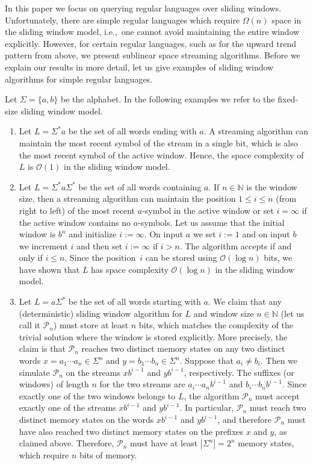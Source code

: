 \documentclass{theoretics}
\newcommand{\N}{\mathbb{N}}
\renewcommand{\O}{\mathcal{O}}
\renewcommand{\P}{\mathcal{P}}
\renewcommand{\leq}{\leqslant}
\renewcommand{\le}{\leq}
\begin{document}
In this paper we focus on querying regular languages over sliding windows.
Unfortunately, there are simple regular languages which require $\Omega(n)$ space in the sliding window model,
i.e.,~one cannot avoid maintaining the entire window explicitly.
However, for certain regular languages, such as for the upward trend pattern from above,
we present sublinear space streaming algorithms.
Before we explain our results in more detail, let us give 
examples of sliding window algorithms for simple regular languages.

\begin{example} 
\label{ex:three-sw}
Let $\Sigma = \{a,b\}$ be the alphabet. In the following examples we refer to the fixed-size sliding window model.
\begin{enumerate}[label=(\roman{*}), ref=(\roman{*})]
\item Let $L = \Sigma^* a$ be the set of all words ending with $a$.
A streaming algorithm can maintain the most recent symbol of the stream in a single bit,
which is also the most recent symbol of the active window.
Hence, the space complexity of $L$ is $\O(1)$ in the sliding window model.
\item Let $L = \Sigma^* a \Sigma^*$ be the set of all words containing $a$.
If $n \in \N$ is the window size,
then a streaming algorithm can maintain the position $1 \le i \le n$ (from right to left)
of the most recent $a$-symbol in the active window or set $i = \infty$ if the active window contains no $a$-symbols.
Let us assume that the initial window is $b^n$
and initialize $i := \infty$.
On input $a$ we set $i := 1$
and on input $b$ we increment $i$
and then set $i := \infty$ if $i > n$.
The algorithm accepts if and only if $i \le n$.
Since the position~$i$ can be stored using $\O(\log n)$ bits,
we have shown that $L$ has space complexity $\O(\log n)$ in the sliding window model.

\item Let $L = a \Sigma^*$ be the set of all words starting with $a$.
We claim that any (deterministic) sliding window algorithm for $L$
and window size $n \in \N$ 
(let us call it $\P_n$) must store at least $n$ bits,
which matches the complexity of the trivial solution where the window is stored explicitly.
More precisely, the claim is that $\P_n$ reaches two distinct memory states
on any two distinct words $x = a_1 \cdots a_n \in \Sigma^n$
and $y = b_1 \cdots b_n \in \Sigma^n$.
Suppose that $a_i \neq b_i$.
Then we simulate $\P_n$ on the streams $x b^{i-1}$ and $y b^{i-1}$, respectively.
The suffixes (or windows) of length $n$ for the two streams
are $a_i \cdots a_n b^{i-1}$ and $b_i \cdots b_n b^{i-1}$.
Since exactly one of the two windows belongs to $L$,
the algorithm $\P_n$ must accept exactly one of the streams $x b^{i-1}$ and $y b^{i-1}$.
In particular, $\P_n$ must reach two distinct memory states on the
words $x b^{i-1}$ and $y b^{i-1}$, and
therefore $\P_n$ must have also reached two distinct memory states on the prefixes $x$ and $y$,
as claimed above.
Therefore, $\P_n$ must have at least $|\Sigma^n| = 2^n$ memory states,
which require $n$ bits of memory. \qedhere
\end{enumerate}
\end{example}
\end{document}
